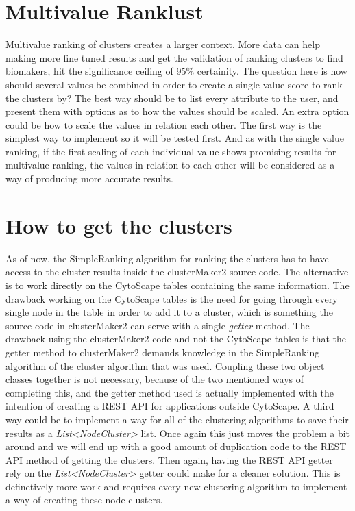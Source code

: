 \section{Multivalue Ranklust}
Multivalue ranking of clusters creates a larger context. More data can help
making more fine tuned results and get the validation of ranking clusters to
find biomakers, hit the significance ceiling of 95\% certainity. 
The question here is how should several values be combined in order to create a
single value score to rank the clusters by? The best way should be to list every
attribute to the user, and present them with options as to how the values should
be scaled. An extra option could be how to scale the values in relation each
other. The first way is the simplest way to implement so it will be tested
first. And as with the single value ranking, if the first scaling of each
individual value shows promising results for multivalue ranking, the values in
relation to each other will be considered as a way of producing more accurate
results.

\section{How to get the clusters}
As of now, the SimpleRanking algorithm for ranking the clusters has to have
access to the cluster results inside the clusterMaker2 source code. The
alternative is to work directly on the CytoScape tables containing the same
information. The drawback working on the CytoScape tables is the need for going
through every single node in the table in order to add it to a cluster, which is
something the source code in clusterMaker2 can serve with a single
\textit{getter} method. The drawback using the clusterMaker2 code and not the
CytoScape tables is that the getter method to clusterMaker2 demands knowledge in
the SimpleRanking algorithm of the cluster algorithm that was used. Coupling
these two object classes together is not necessary, because of the two mentioned
ways of completing this, and the getter method used is actually implemented with
the intention of creating a REST API \cite{rest-api} for applications outside
CytoScape. A third way could be to implement a way for all of the clustering
algorithms to save their results as a \textit{List<NodeCluster>} list. Once
again this just moves the problem a bit around and we will end up with a good
amount of duplication code to the REST API method of getting the clusters. Then
again, having the REST API getter rely on the \textit{List<NodeCluster>} getter
could make for a cleaner solution. This is definetively more work and requires
every new clustering algorithm to implement a way of creating these node
clusters.

